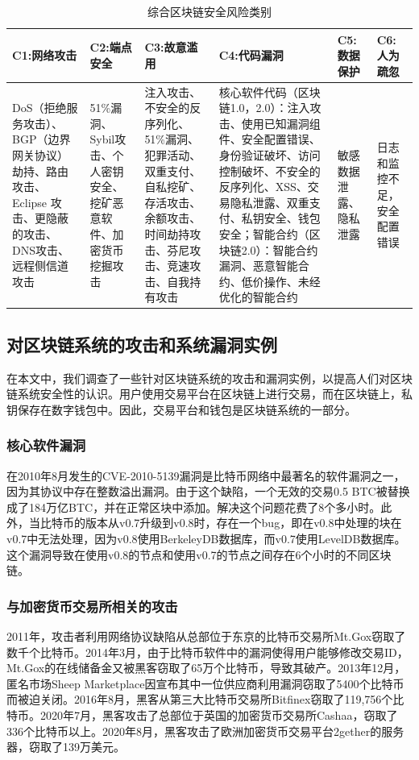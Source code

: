 \begin{translation}
\begin{table}[htbp] 
    \centering 
    \caption{综合区块链安全风险类别} 
    \label{tab:综合区块链安全风险类别} 
    \begin{tabular}{|p{2cm}|p{1.8cm}|p{2.5cm}|p{4cm}|p{1.2cm}|p{1.2cm}|} 
    \hline C1:网络攻击 & C2:端点安全 & C3:故意滥用 & C4:代码漏洞 & C5:数据保护 & C6:人为疏忽 \\
    \hline DoS（拒绝服务攻击）、BGP（边界网关协议）劫持、路由攻击、Eclipse 攻击、更隐蔽的攻击、DNS攻击、远程侧信道攻击 & 51\%漏洞、Sybil攻击、个人密钥安全、挖矿恶意软件、加密货币挖掘攻击 & 注入攻击、不安全的反序列化、51\%漏洞、犯罪活动、双重支付、自私挖矿、存活攻击、余额攻击、时间劫持攻击、芬尼攻击、竞速攻击、自我持有攻击 & 核心软件代码（区块链1.0，2.0）：注入攻击、使用已知漏洞组件、安全配置错误、身份验证破坏、访问控制破坏、不安全的反序列化、XSS、交易隐私泄露、双重支付、私钥安全、钱包安全；智能合约（区块链2.0）：智能合约漏洞、恶意智能合约、低价操作、未经优化的智能合约 & 敏感数据泄露、隐私泄露 & 日志和监控不足，安全配置错误 \\ \hline 
    \end{tabular} 
\end{table}

\subsection{对区块链系统的攻击和系统漏洞实例}
在本文中，我们调查了一些针对区块链系统的攻击和漏洞实例，以提高人们对区块链系统安全性的认识。用户使用交易平台在区块链上进行交易，而在区块链上，私钥保存在数字钱包中。因此，交易平台和钱包是区块链系统的一部分。

\subsubsection{核心软件漏洞}
在2010年8月发生的CVE-2010-5139漏洞是比特币网络中最著名的软件漏洞之一，因为其协议中存在整数溢出漏洞。由于这个缺陷，一个无效的交易0.5 BTC被替换成了184万亿BTC，并在正常区块中添加。解决这个问题花费了8个多小时\cite{art55}。此外，当比特币的版本从v0.7升级到v0.8时，存在一个bug，即在v0.8中处理的块在v0.7中无法处理，因为v0.8使用BerkeleyDB数据库，而v0.7使用LevelDB数据库。这个漏洞导致在使用v0.8的节点和使用v0.7的节点之间存在6个小时的不同区块链\cite{art55}。

\subsubsection{与加密货币交易所相关的攻击}
2011年，攻击者利用网络协议缺陷从总部位于东京的比特币交易所Mt.Gox窃取了数千个比特币。2014年3月，由于比特币软件中的漏洞使得用户能够修改交易ID，Mt.Gox的在线储备金又被黑客窃取了65万个比特币，导致其破产\cite{art56}。2013年12月，匿名市场Sheep Marketplace因宣布其中一位供应商利用漏洞窃取了5400个比特币而被迫关闭\cite{art57}。2016年8月，黑客从第三大比特币交易所Bitfinex窃取了119,756个比特币\cite{art58}。2020年7月，黑客攻击了总部位于英国的加密货币交易所Cashaa，窃取了336个比特币以上。2020年8月，黑客攻击了欧洲加密货币交易平台2gether的服务器，窃取了139万美元\cite{art59}。


\end{translation}
